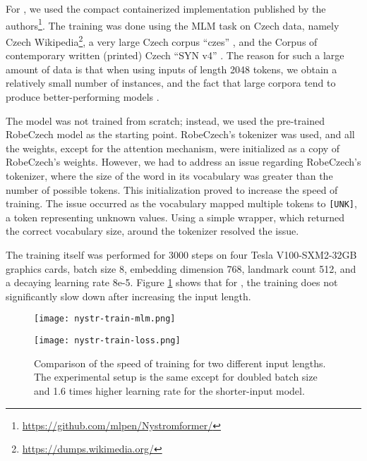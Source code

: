 \section{\nystr{}}

For \nystr, we used the compact containerized implementation published by the authors\footnote{\url{https://github.com/mlpen/Nystromformer/}}.
The training was done using the MLM task on Czech data, namely Czech Wikipedia\footnote{\url{https://dumps.wikimedia.org/}}, a very large Czech corpus ``czes'' \citet{czes}, and the Corpus of contemporary written (printed) Czech ``SYN v4'' \citep{syn}. 
The reason for such a large amount of data is that when using inputs of length 2048 tokens, we obtain a relatively small number of instances, and the fact that large corpora tend to produce better-performing models \citep{xlmr}.

The model was not trained from scratch; instead, we used the pre-trained RobeCzech model as the starting point. RobeCzech's tokenizer was used, and all the weights, except for the attention mechanism, were initialized as a copy of RobeCzech's weights.
However, we had to address an issue regarding RobeCzech's tokenizer, where the size of the word in its vocabulary was greater than the number of possible tokens. 
This initialization proved to increase the speed of training.
The issue occurred as the vocabulary mapped multiple tokens to \texttt{[UNK]}, a token representing unknown values.
Using a simple wrapper, which returned the correct vocabulary size, around the tokenizer resolved the issue.

The training itself was performed for 3000 steps on four Tesla V100-SXM2-32GB graphics cards, batch size 8, embedding dimension 768, landmark count 512, and a decaying learning rate 8e-5. Figure \ref{fig:nystr_training} shows that for \nystr{}, the training does not significantly slow down after increasing the input length.

\begin{figure}[!htb]
    \centering
    \begin{minipage}{.49\textwidth}
        \texttt{[image: nystr-train-mlm.png]}
    \end{minipage}
    \hfill
    \begin{minipage}{.49\textwidth}
        \texttt{[image: nystr-train-loss.png]}
    \end{minipage}
    \caption[\nystr{} Training]{Comparison of the speed of training for two different input lengths. The experimental setup is the same except for doubled batch size and 1.6 times higher learning rate for the shorter-input model.}
    \label{fig:nystr_training}
\end{figure}

